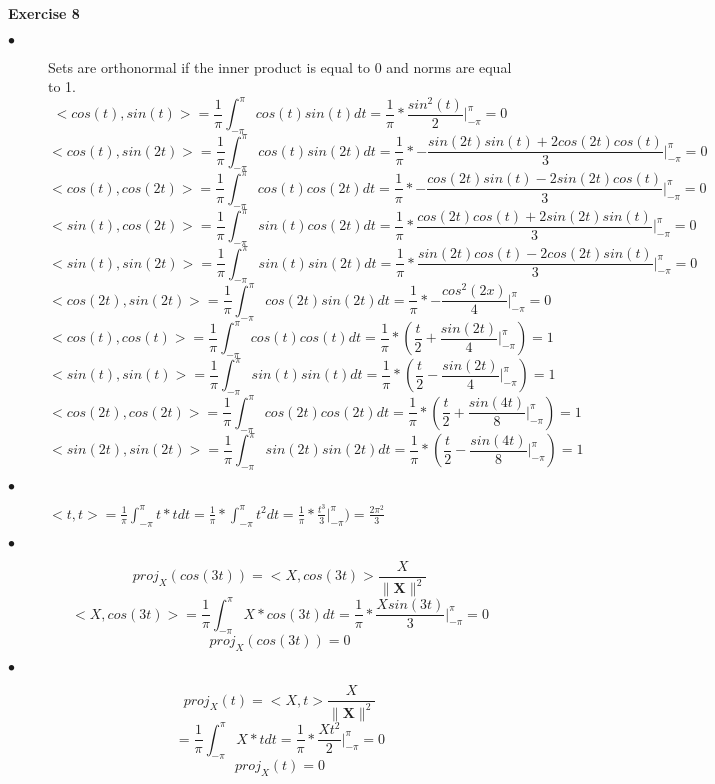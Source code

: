 \documentclass[letterpaper,12pt]{article}
\theoremstyle{definition}
\begin{document}
\vspace{3mm}
\noindent\textbf{Exercise 8}
\begin{description}
  \item[$\bullet$] Sets are orthonormal if the inner product is equal to 0 and norms are equal to 1.
  \[<cos(t), sin(t)> = \frac{1}{\pi} \int_{-\pi}^{\pi} cos(t)sin(t)dt = \frac{1}{\pi} * \frac{sin^2(t)}{2}|_{-\pi}^{\pi} = 0\]
  \[<cos(t), sin(2t)> = \frac{1}{\pi} \int_{-\pi}^{\pi} cos(t)sin(2t)dt = \frac{1}{\pi} * -\frac{sin(2t)sin(t) + 2cos(2t)cos(t)}{3}|_{-\pi}^{\pi} = 0\]
  \[<cos(t), cos(2t)> = \frac{1}{\pi} \int_{-\pi}^{\pi} cos(t)cos(2t)dt = \frac{1}{\pi} * -\frac{cos(2t)sin(t) - 2sin(2t)cos(t)}{3}|_{-\pi}^{\pi} = 0\]
  \[<sin(t), cos(2t)> = \frac{1}{\pi} \int_{-\pi}^{\pi} sin(t)cos(2t)dt = \frac{1}{\pi} * \frac{cos(2t)cos(t) + 2sin(2t)sin(t)}{3}|_{-\pi}^{\pi} = 0\]
  \[<sin(t), sin(2t)> = \frac{1}{\pi} \int_{-\pi}^{\pi} sin(t)sin(2t)dt = \frac{1}{\pi} * \frac{sin(2t)cos(t) - 2cos(2t)sin(t)}{3}|_{-\pi}^{\pi} = 0\]
 \[<cos(2t), sin(2t)> = \frac{1}{\pi} \int_{-\pi}^{\pi} cos(2t)sin(2t)dt = \frac{1}{\pi} * -\frac{cos^2(2x)}{4}|_{-\pi}^{\pi} = 0\]
   \[<cos(t), cos(t)> = \frac{1}{\pi} \int_{-\pi}^{\pi} cos(t)cos(t)dt = \frac{1}{\pi} * (\frac{t}{2} + \frac{sin(2t)}{4}|_{-\pi}^{\pi}) = 1\]
	\[<sin(t), sin(t)> = \frac{1}{\pi} \int_{-\pi}^{\pi} sin(t)sin(t)dt = \frac{1}{\pi} * (\frac{t}{2} - \frac{sin(2t)}{4}|_{-\pi}^{\pi}) = 1\]
  \[<cos(2t), cos(2t)> = \frac{1}{\pi} \int_{-\pi}^{\pi} cos(2t)cos(2t)dt = \frac{1}{\pi} * (\frac{t}{2} + \frac{sin(4t)}{8}|_{-\pi}^{\pi}) = 1\]
  \[<sin(2t), sin(2t)> = \frac{1}{\pi} \int_{-\pi}^{\pi} sin(2t)sin(2t)dt = \frac{1}{\pi} * (\frac{t}{2} - \frac{sin(4t)}{8}|_{-\pi}^{\pi}) = 1\]
  \item[$\bullet$]  $<t, t> = \frac{1}{\pi} \int_{-\pi}^{\pi} t * t dt =\frac{1}{\pi} * \int_{-\pi}^{\pi} t^2 dt = \frac{1}{\pi} * \frac{t^3}{3}|_{-\pi}^{\pi}) = \frac{2\pi^2}{3}$
  \item[$\bullet$] \[proj_X(cos(3t)) = <X, cos(3t)>\frac{X}{\lVert\mathbf{X}\rVert^2}\]
  \[<X, cos(3t)> = \frac{1}{\pi} \int_{-\pi}^{\pi} X * cos(3t) dt = \frac{1}{\pi} * \frac{Xsin(3t)}{3}|_{-\pi}^\pi = 0\]
  \[proj_X(cos(3t)) = 0\]
  \item[$\bullet$] \[proj_X(t) = <X, t>\frac{X}{\lVert\mathbf{X}\rVert^2}\]
  \[<X,t> = \frac{1}{\pi} \int_{-\pi}^{\pi} X * t dt = \frac{1}{\pi} * \frac{Xt^2}{2}|_{-\pi}^\pi = 0\]
  \[proj_X(t) = 0\]
\end{description}
\end{document}
